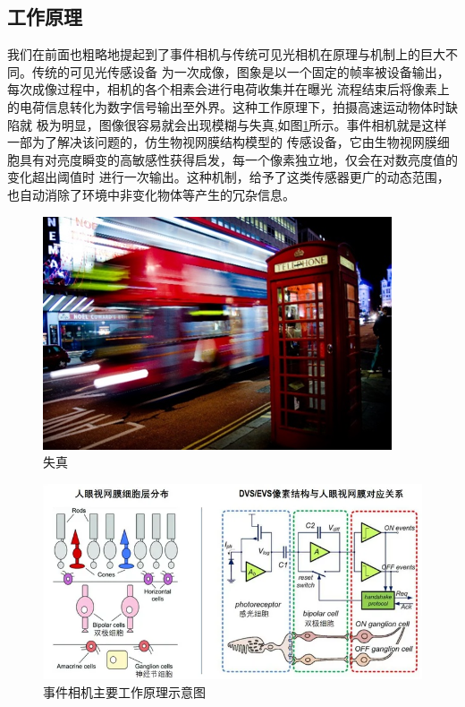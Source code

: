 \subsection{工作原理}
我们在前面也粗略地提起到了事件相机与传统可见光相机在原理与机制上的巨大不同。传统的可见光传感设备
为一次成像，图象是以一个固定的帧率被设备输出，每次成像过程中，相机的各个相素会进行电荷收集并在曝光
流程结束后将像素上的电荷信息转化为数字信号输出至外界。这种工作原理下，拍摄高速运动物体时缺陷就
极为明显，图像很容易就会出现模糊与失真,如图\ref{3}所示。事件相机就是这样一部为了解决该问题的，仿生物视网膜结构模型的
传感设备\cite{tayarani2021event}，它由生物视网膜细胞具有对亮度瞬变的高敏感性获得启发，每一个像素独立地，仅会在对数亮度值的变化超出阈值时
进行一次输出。这种机制，给予了这类传感器更广的动态范围，也自动消除了环境中非变化物体等产生的冗杂信息。
\begin{figure}
    \centering
    \includegraphics[width=\textwidth]{figures/motion_blur.png}
    \caption{失真}
    \label{3}
\end{figure}
\begin{figure}
    \centering
    \includegraphics[width=\textwidth]{figures/working_principle.png}
    \caption{事件相机主要工作原理示意图}
    \label{2}
\end{figure}

